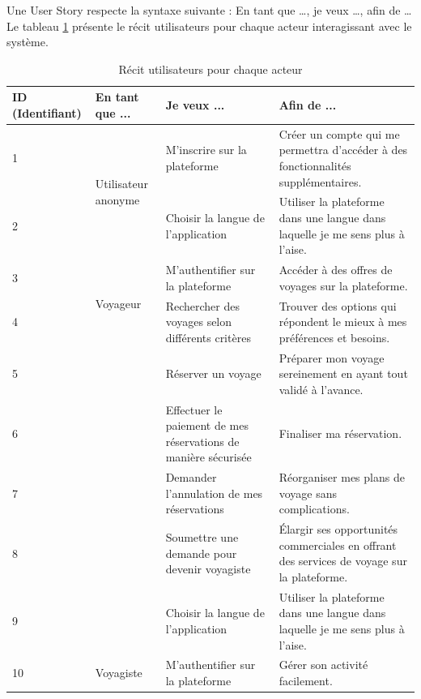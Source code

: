 \documentclass[12pt]{report}
\begin{document}
				Une User Story respecte la syntaxe suivante : En tant que …, je veux …, afin de …\\

				Le tableau \ref{tab:UserStories} présente le récit utilisateurs pour chaque acteur interagissant avec le système.

				\begin{longtable}{|p{2cm}|p{4cm}|p{4cm}|p{4cm}|}
					\caption{Récit utilisateurs pour chaque acteur}
					\label{tab:UserStories}\\
					\hline
					\textbf{ID (Identifiant)} & \textbf{En tant que ...} & \textbf{Je veux ...} & \textbf{Afin de ...}\\
					\hline
					\endfirsthead
					\hline
					\endhead
					1 & \multirow{2}{*}{Utilisateur anonyme} & M'inscrire sur la plateforme & Créer un compte qui me permettra d'accéder à des fonctionnalités supplémentaires. \\ \cline{1-1} \cline{3-4}
					2 & & Choisir la langue de l’application & Utiliser la plateforme dans une langue dans laquelle je me sens plus à l’aise. \\ 
					\hline
					3 & \multirow{2}{*}{Voyageur}& M'authentifier sur la plateforme & Accéder à des offres de voyages sur la plateforme.\\ \cline{1-1} \cline{3-4}
					4 & & Rechercher des voyages selon différents critères & Trouver des options qui répondent le mieux à mes préférences et besoins.\\ \cline{1-1} \cline{3-4}
					5&&  Réserver un voyage & Préparer mon voyage sereinement en ayant tout validé à l’avance.\\ \cline{1-1} \cline{3-4}
					6&& Effectuer le paiement de mes réservations de manière sécurisée & Finaliser ma réservation.\\ \cline{1-1} \cline{3-4}
					7&& Demander l'annulation de mes réservations & Réorganiser mes plans de voyage sans complications.\\ 	
					\hline
					8& & Soumettre une demande pour devenir voyagiste & Élargir ses opportunités commerciales en offrant des services de voyage sur la plateforme.\\ \cline{1-1} \cline{3-4}
					9 && Choisir la langue de l’application & Utiliser la plateforme dans une langue dans laquelle je me sens plus à l’aise. \\
					\hline
					10 & \multirow{2}{*}{Voyagiste}& M'authentifier sur la plateforme&Gérer son activité facilement.\\ \cline{1-1} \cline{3-4}

\end{longtable}
\end{document}
